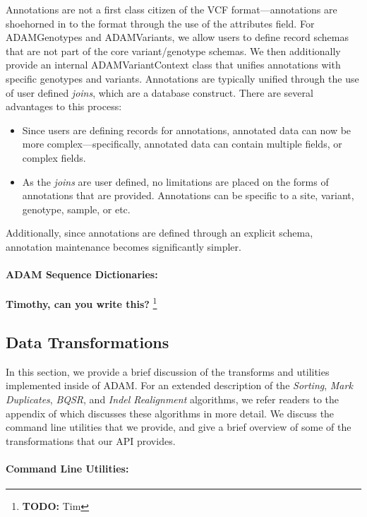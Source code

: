 \documentclass{bioinfo}
\newcommand{\todo}[1]{\footnote{\textbf{TODO:} #1}}
\begin{document}
Annotations are not a first class citizen of the VCF format---annotations are shoehorned in to the format through the use of the attributes field. For ADAMGenotypes and
ADAMVariants, we allow users to define record schemas that are not part of the core variant/genotype schemas. We then additionally provide an internal ADAMVariantContext
class that unifies annotations with specific genotypes and variants. Annotations are typically unified through the use of user defined \emph{joins}, which are a database
construct. There are several advantages to this process:

\begin{itemize}
\item Since users are defining records for annotations, annotated data can now be more complex---specifically, annotated data can contain multiple fields, or complex fields.
\item As the \emph{joins} are user defined, no limitations are placed on the forms of annotations that are provided. Annotations can be specific to a site, variant, genotype,
sample, or etc.
\end{itemize}

Additionally, since annotations are defined through an explicit schema, annotation maintenance becomes significantly simpler.

\paragraph{ADAM Sequence Dictionaries:}
\label{sec:adam-sequence-dictionaries}

\textbf{Timothy, can you write this?} \todo{Tim}

\subsection{Data Transformations}
\label{sec:data-transformations}

In this section, we provide a brief discussion of the transforms and utilities implemented inside of ADAM. For an extended description of the \textit{Sorting}, \textit{Mark
Duplicates}, \textit{BQSR}, and \textit{Indel Realignment} algorithms, we refer readers to the appendix of \citet{massie13} which discusses these algorithms in more detail.
We discuss the command line utilities that we provide, and give a brief overview of some of the transformations that our API provides.

\paragraph{Command Line Utilities:}
\label{sec:command-line-utilities}
\end{document}
